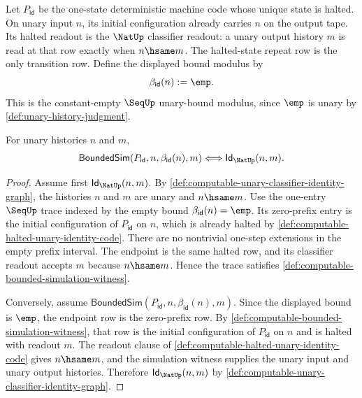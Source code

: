\begin{definition}
\label{def:computable-halted-unary-identity-code}
Let $P_{\mathsf{id}}$ be the one-state deterministic machine code whose unique state is halted. On unary input $n$, its initial configuration already carries $n$ on the output tape. Its halted readout is the $\NatUp$ classifier readout: a unary output history $m$ is read at that row exactly when $n\hsame m$. The halted-state repeat row is the only transition row. Define the displayed bound modulus by
$$
  \beta_{\mathsf{id}}(n):=\emp.
$$
This is the constant-empty $\SeqUp$ unary-bound modulus, since $\emp$ is unary by \autoref{def:unary-history-judgment}.
\end{definition}

\begin{lemma}
\label{lem:computable-identity-empty-bound-simulation-exactness}
For unary histories $n$ and $m$,
$$
  \mathsf{BoundedSim}(P_{\mathsf{id}},n,\beta_{\mathsf{id}}(n),m)
  \Longleftrightarrow
  \mathsf{Id}_{\NatUp}(n,m).
$$
\end{lemma}
\begin{proof}
Assume first $\mathsf{Id}_{\NatUp}(n,m)$. By \autoref{def:computable-unary-classifier-identity-graph}, the histories $n$ and $m$ are unary and $n\hsame m$. Use the one-entry $\SeqUp$ trace indexed by the empty bound $\beta_{\mathsf{id}}(n)=\emp$. Its zero-prefix entry is the initial configuration of $P_{\mathsf{id}}$ on $n$, which is already halted by \autoref{def:computable-halted-unary-identity-code}. There are no nontrivial one-step extensions in the empty prefix interval. The endpoint is the same halted row, and its classifier readout accepts $m$ because $n\hsame m$. Hence the trace satisfies \autoref{def:computable-bounded-simulation-witness}.

Conversely, assume $\mathsf{BoundedSim}(P_{\mathsf{id}},n,\beta_{\mathsf{id}}(n),m)$. Since the displayed bound is $\emp$, the endpoint row is the zero-prefix row. By \autoref{def:computable-bounded-simulation-witness}, that row is the initial configuration of $P_{\mathsf{id}}$ on $n$ and is halted with readout $m$. The readout clause of \autoref{def:computable-halted-unary-identity-code} gives $n\hsame m$, and the simulation witness supplies the unary input and unary output histories. Therefore $\mathsf{Id}_{\NatUp}(n,m)$ by \autoref{def:computable-unary-classifier-identity-graph}.
\end{proof}

